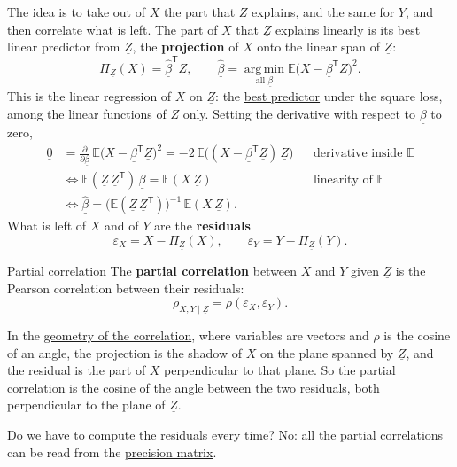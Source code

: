 \documentclass[a4paper,12pt,oneside]{report}
\begin{document}
The idea is to take out of $X$ the part that $\underline{Z}$ explains, and
the same for $Y$, and then correlate what is left. The part of $X$ that
$\underline{Z}$ explains linearly is its best linear predictor from
$\underline{Z}$, the \textbf{projection} of $X$ onto the linear span of
$\underline{Z}$:
\[
\Pi_{\underline{Z}}(X)=\widehat{\underline{\beta}}^{\mathsf T}\underline{Z},
\qquad
\widehat{\underline{\beta}}=\operatorname*{arg\,min}_{\text{all }\underline{\beta}}\mathbb{E}\big(X-\underline{\beta}^{\mathsf T}\underline{Z}\big)^2 .
\]
This is the linear regression of $X$ on $\underline{Z}$: the
\hyperref[def:best-predictor]{best predictor} under the square loss, among
the linear functions of $\underline{Z}$ only. Setting the derivative with
respect to $\underline{\beta}$ to zero,
\begin{align*}
\underline{0}
&=\frac{\partial}{\partial\underline{\beta}}\,\mathbb{E}\big(X-\underline{\beta}^{\mathsf T}\underline{Z}\big)^2
=-2\,\mathbb{E}\big((X-\underline{\beta}^{\mathsf T}\underline{Z})\,\underline{Z}\big)
&&\text{derivative inside $\mathbb{E}$}\\
&\iff
\mathbb{E}(\underline{Z}\,\underline{Z}^{\mathsf T})\,\underline{\beta}=\mathbb{E}(X\,\underline{Z})
&&\text{linearity of $\mathbb{E}$}\\
&\iff
\widehat{\underline{\beta}}=\big(\mathbb{E}(\underline{Z}\,\underline{Z}^{\mathsf T})\big)^{-1}\,\mathbb{E}(X\,\underline{Z}).
\end{align*}
What is left of $X$ and of $Y$ are the \textbf{residuals}
\[
\varepsilon_X=X-\Pi_{\underline{Z}}(X),
\qquad
\varepsilon_Y=Y-\Pi_{\underline{Z}}(Y).
\]

\begin{frameddefn}{Partial correlation}\label{def:partial-correlation}
The \textbf{partial correlation} between $X$ and $Y$ given
$\underline{Z}$ is the Pearson correlation between their residuals:
\[
\rho_{X,Y\mid\underline{Z}}=\rho(\varepsilon_X,\varepsilon_Y).
\]
\end{frameddefn}

In the \hyperref[sec:corr-geometry]{geometry of the correlation}, where
variables are vectors and $\rho$ is the cosine of an angle, the projection
is the shadow of $X$ on the plane spanned by $\underline{Z}$, and the
residual is the part of $X$ perpendicular to that plane. So the partial
correlation is the cosine of the angle between the two residuals, both
perpendicular to the plane of $\underline{Z}$.

Do we have to compute the residuals every time? No: all the partial
correlations can be read from the \hyperref[def:precision]{precision
matrix}.
\end{document}
